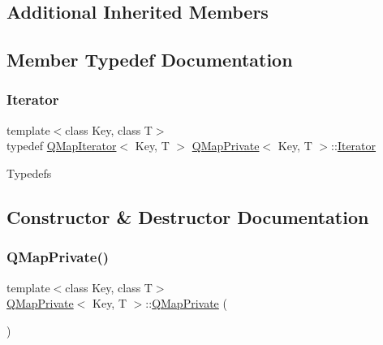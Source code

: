 \subsection*{Additional Inherited Members}


\subsection{Member Typedef Documentation}
\mbox{\label{class_q_map_private_a5326545ba578532909650c2f4a8d4d34}} 
\subsubsection{\texorpdfstring{Iterator}{Iterator}}
{\footnotesize\ttfamily template$<$class Key, class T$>$ \\
typedef \mbox{\hyperlink{class_q_map_iterator}{Q\+Map\+Iterator}}$<$ Key, T $>$ \mbox{\hyperlink{class_q_map_private}{Q\+Map\+Private}}$<$ Key, T $>$\+::\mbox{\hyperlink{class_q_map_private_a5326545ba578532909650c2f4a8d4d34}{Iterator}}}

Typedefs 

\subsection{Constructor \& Destructor Documentation}
\mbox{\label{class_q_map_private_a4e52679058c7c68f4e188dbb1f81ddf2}} 
\subsubsection{\texorpdfstring{QMapPrivate()}{QMapPrivate()}}
{\footnotesize\ttfamily template$<$class Key, class T$>$ \\
\mbox{\hyperlink{class_q_map_private}{Q\+Map\+Private}}$<$ Key, T $>$\+::\mbox{\hyperlink{class_q_map_private}{Q\+Map\+Private}} (\begin{DoxyParamCaption}{ }\end{DoxyParamCaption})\hspace{0.3cm}{\ttfamily [inline]}}

